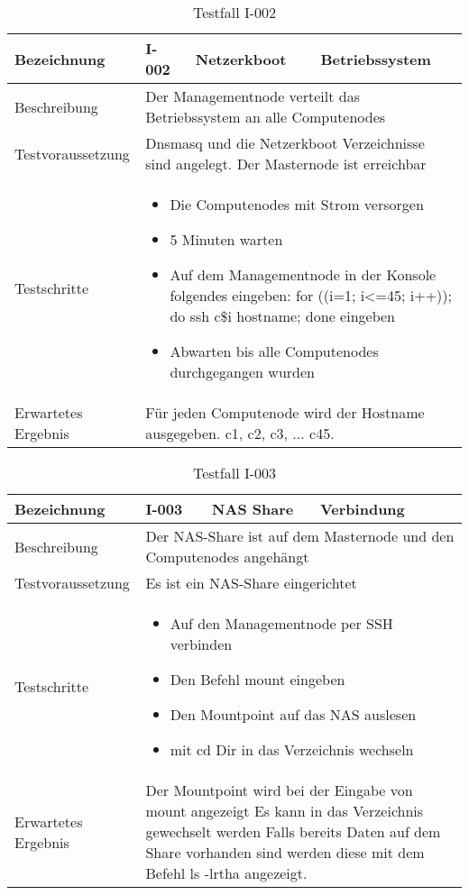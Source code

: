 \begin{table}[H]
\centering
\begin{tabular}{|p{4cm}|p{4cm}|p{4cm}|p{4cm}|}
\hline
Bezeichnung & \textbf{I-002} & Netzerkboot & Betriebssystem \\\hline
Beschreibung & \multicolumn{3}{p{12cm}|}{Der Managementnode verteilt das Betriebssystem an alle Computenodes} \\\hline
Testvoraussetzung & \multicolumn{3}{p{12cm}|}{Dnsmasq und die Netzerkboot Verzeichnisse sind angelegt. Der Masternode ist erreichbar} \\\hline
Testschritte & \multicolumn{3}{p{12cm}|}{\begin{itemize}
\item Die Computenodes mit Strom versorgen
\item 5 Minuten warten
\item Auf dem Managementnode in der Konsole folgendes eingeben: for ((i=1; i<=45; i++)); do ssh c\$i hostname; done eingeben
\item Abwarten bis alle Computenodes durchgegangen wurden
\end{itemize}} \\ \hline
Erwartetes Ergebnis & \multicolumn{3}{p{12cm}|}{Für jeden Computenode wird der Hostname ausgegeben. c1, c2, c3, ... c45.}\\\hline
\end{tabular}
\caption{Testfall I-002}
\label{Testfall I-002}
\end{table}

\begin{table}[H]
\centering
\begin{tabular}{|p{4cm}|p{4cm}|p{4cm}|p{4cm}|}
\hline
Bezeichnung & \textbf{I-003} & NAS Share & Verbindung \\\hline
Beschreibung & \multicolumn{3}{p{12cm}|}{Der NAS-Share ist auf dem Masternode und den Computenodes angehängt} \\\hline
Testvoraussetzung & \multicolumn{3}{p{12cm}|}{Es ist ein NAS-Share eingerichtet} \\\hline
Testschritte & \multicolumn{3}{p{12cm}|}{\begin{itemize}
\item Auf den Managementnode per SSH verbinden
\item Den Befehl mount eingeben
\item Den Mountpoint auf das NAS auslesen
\item mit cd Dir in das Verzeichnis wechseln
\end{itemize}} \\ \hline
Erwartetes Ergebnis & \multicolumn{3}{p{12cm}|}{Der Mountpoint wird bei der Eingabe von mount angezeigt \newline
Es kann in das Verzeichnis gewechselt werden \newline
Falls bereits Daten auf dem Share vorhanden sind werden diese mit dem Befehl ls -lrtha angezeigt.}\\\hline
\end{tabular}
\caption{Testfall I-003}
\label{Testfall I-003}
\end{table}

